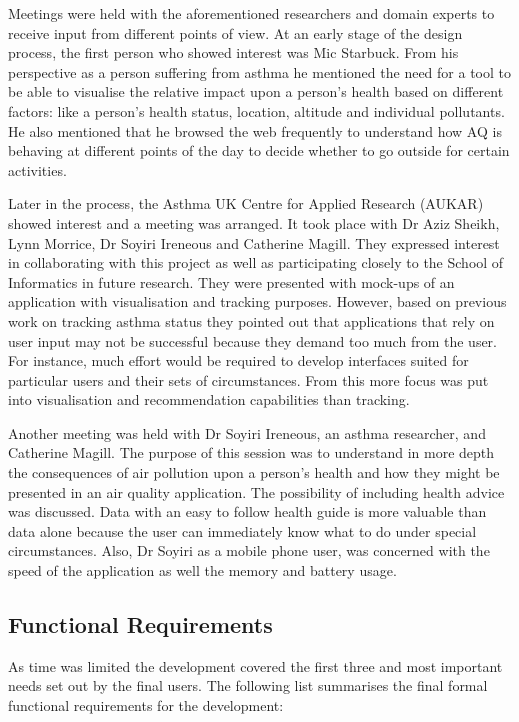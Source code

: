 Meetings were held with the aforementioned researchers and domain experts to receive input from different points of view. At an early stage of the design process, the first person who showed interest was Mic Starbuck. From his perspective as a person suffering from asthma he mentioned the need for a tool to be able to visualise the relative impact upon a person's health based on different factors: like a person's health status, location, altitude and individual pollutants. He also mentioned that he browsed the web frequently to understand how AQ is behaving at different points of the day to decide whether to go outside for certain activities. 

Later in the process, the Asthma UK Centre for Applied Research (AUKAR) showed interest and a meeting was arranged. It took place with Dr Aziz Sheikh, Lynn Morrice, Dr Soyiri Ireneous and Catherine Magill. They expressed interest in collaborating with this project as well as participating closely to the School of Informatics in future research. They were presented with mock-ups of an application with visualisation and tracking purposes. However, based on previous work on tracking asthma status they pointed out that applications that rely on user input may not be successful because they demand too much from the user. For instance, much effort would be required to develop interfaces suited for particular users and their sets of circumstances. From this more focus was put into visualisation and recommendation capabilities than tracking.

Another meeting was held with Dr Soyiri Ireneous, an asthma researcher, and Catherine Magill. The purpose of this session was to understand in more depth the consequences of air pollution upon a person's health and how they might be presented in an air quality application. The possibility of including health advice was discussed. Data  with an easy to follow health guide is more valuable than data alone because the user can immediately know what to do under special circumstances. Also, Dr Soyiri as a mobile phone user, was concerned with the speed of the application as well the memory and battery usage.

\subsection{Functional Requirements}

As time was limited the development covered the first three and most important needs set out by the final users. The following list summarises the final formal functional requirements for the development:

